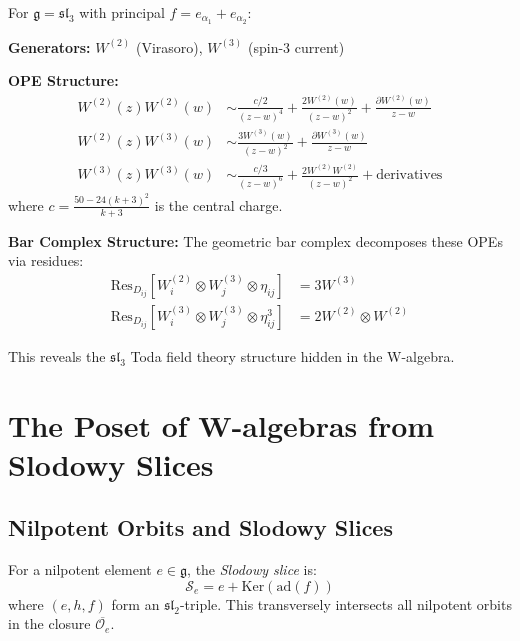 \begin{example}\label{ex:w-sl3}
For $\mathfrak{g} = \mathfrak{sl}_3$ with principal $f = e_{\alpha_1} + e_{\alpha_2}$:

\textbf{Generators:} $W^{(2)}$ (Virasoro), $W^{(3)}$ (spin-3 current)

\textbf{OPE Structure:}
\begin{align}
W^{(2)}(z)W^{(2)}(w) &\sim \frac{c/2}{(z-w)^4} + \frac{2W^{(2)}(w)}{(z-w)^2} + \frac{\partial W^{(2)}(w)}{z-w} \\
W^{(2)}(z)W^{(3)}(w) &\sim \frac{3W^{(3)}(w)}{(z-w)^2} + \frac{\partial W^{(3)}(w)}{z-w} \\
W^{(3)}(z)W^{(3)}(w) &\sim \frac{c/3}{(z-w)^6} + \frac{2W^{(2)}W^{(2)}}{(z-w)^2} + \text{derivatives}
\end{align}
where $c = \frac{50 - 24(k+3)^2}{k+3}$ is the central charge.

\textbf{Bar Complex Structure:}
The geometric bar complex decomposes these OPEs via residues:
\begin{align}
\text{Res}_{D_{ij}}[W^{(2)}_i \otimes W^{(3)}_j \otimes \eta_{ij}] &= 3W^{(3)} \\
\text{Res}_{D_{ij}}[W^{(3)}_i \otimes W^{(3)}_j \otimes \eta_{ij}^3] &= 2W^{(2)} \otimes W^{(2)}
\end{align}

This reveals the $\mathfrak{sl}_3$ Toda field theory structure hidden in the W-algebra.
\end{example}

 
\section{The Poset of W-algebras from Slodowy Slices}
 
\subsection{Nilpotent Orbits and Slodowy Slices}
 
\begin{definition}\label{def:slodowy}
For a nilpotent element $e \in \mathfrak{g}$, the \emph{Slodowy slice} is:
\[
\mathcal{S}_e = e + \text{Ker}(\text{ad}(f))
\]
where $(e,h,f)$ form an $\mathfrak{sl}_2$-triple. This transversely intersects all nilpotent orbits 
in the closure $\overline{\mathcal{O}_e}$.
\end{definition}
 
